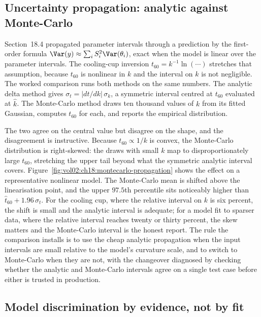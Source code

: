 \subsection{Uncertainty propagation: analytic against Monte-Carlo}

Section~18.4 propagated parameter intervals through a prediction by the
first-order formula $\Var(y) \approx \sum_i S_i^2 \Var(\theta_i)$, exact
when the model is linear over the parameter intervals. The cooling-cup
inversion $t_{60} = k^{-1}\ln(\cdots)$ stretches that assumption, because
$t_{60}$ is nonlinear in $k$ and the interval on $k$ is not negligible. The
worked comparison runs both methods on the same numbers. The analytic
delta method gives $\sigma_{t} = |dt/dk|\,\sigma_k$, a symmetric interval
centred at $t_{60}$ evaluated at $\hat k$. The Monte-Carlo method draws ten
thousand values of $k$ from its fitted Gaussian, computes $t_{60}$ for
each, and reports the empirical distribution.

The two agree on the central value but disagree on the shape, and the
disagreement is instructive. Because $t_{60} \propto 1/k$ is convex, the
Monte-Carlo distribution is right-skewed: the draws with small $k$ map to
disproportionately large $t_{60}$, stretching the upper tail beyond what
the symmetric analytic interval covers.
Figure~\ref{fig:vol02:ch18:montecarlo-propagation} shows the effect on a
representative nonlinear model. The Monte-Carlo mean is shifted above the
linearisation point, and the upper $97.5$th percentile sits noticeably
higher than $\hat t_{60} + 1.96\,\sigma_t$. For the cooling cup, where the
relative interval on $k$ is six percent, the shift is small and the
analytic interval is adequate; for a model fit to sparser data, where the
relative interval reaches twenty or thirty percent, the skew matters and
the Monte-Carlo interval is the honest report. The rule the comparison
installs is to use the cheap analytic propagation when the input intervals
are small relative to the model's curvature scale, and to switch to
Monte-Carlo when they are not, with the changeover diagnosed by checking
whether the analytic and Monte-Carlo intervals agree on a single test case
before either is trusted in production.



\subsection{Model discrimination by evidence, not by fit}

